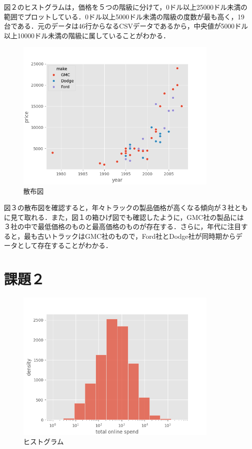 \documentclass[article]{jlreq}
\begin{document}
図２のヒストグラムは，価格を５つの階級に分けて，0ドル以上25000ドル未満の範囲でプロットしている．0ドル以上5000ドル未満の階級の度数が最も高く，19台である．元のデータは46行からなるCSVデータであるから，中央値が5000ドル以上10000ドル未満の階級に属していることがわかる．

\begin{figure}[H]
  \centering
  \includegraphics[width=100mm]{../plots/hw1/scatterplot.png}
  \caption{散布図}
\end{figure}

図３の散布図を確認すると，年々トラックの製品価格が高くなる傾向が３社ともに見て取れる．また，図１の箱ひげ図でも確認したように，GMC社の製品には３社の中で最低価格のものと最高価格のものが存在する．さらに，年代に注目すると，最も古いトラックはGMC社のもので，Ford社とDodge社が同時期からデータとして存在することがわかる．

\section{課題２}

\begin{figure}[H]
  \centering
  \includegraphics[width=100mm]{../plots/hw1/density.png}
  \caption{ヒストグラム}
\end{figure}
\end{document}
